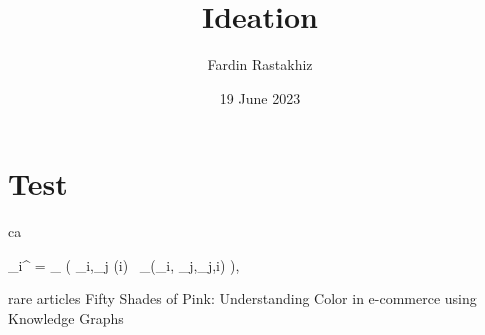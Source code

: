 \documentclass[a4paper,10pt]{article}
\title{Ideation}
\author{Fardin Rastakhiz}
\date{19 June 2023}
\begin{document}
\maketitle

\section*{Test}


ca


_i^{\prime} = \gamma_{\mathbf{\Theta}} \left( _i,\bigoplus_{j \in {}(i)} \, \phi_{\mathbf{\Theta}}\left(_i, _j,_{j,i}\right) \right),

rare articles
Fifty Shades of Pink: Understanding Color in e-commerce using Knowledge Graphs
\end{document}
